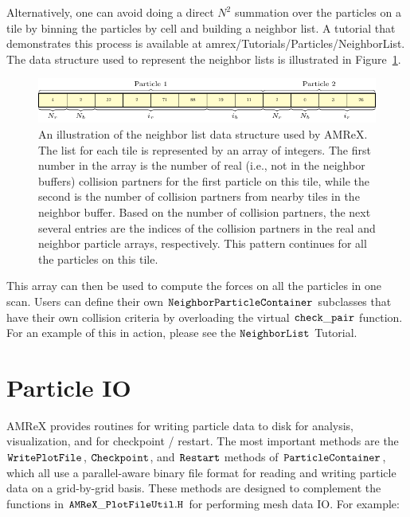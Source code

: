 Alternatively, one can avoid doing a direct $N^2$ summation over the particles on a tile by binning the particles by cell and building a neighbor list. A tutorial that demonstrates this process is available at amrex/Tutorials/Particles/NeighborList. The data structure used to represent the neighbor lists is illustrated in Figure~\ref{fig:particles:neighbor_list}.

\begin{figure}
  \centering
  \includegraphics[width=\textwidth]{./Particle/neighbor_list.pdf}
  \caption{\label{fig:particles:neighbor_list} An illustration of the neighbor list data structure used by AMReX. The list for each tile is represented by an array of integers. The first number in the array is the number of real (i.e., not in the neighbor buffers) collision partners for the first particle on this tile, while the second is the number of collision partners from nearby tiles in the neighbor buffer. Based on the number of collision partners, the next several entries are the indices of the collision partners in the real and neighbor particle arrays, respectively. This pattern continues for all the particles on this tile.}
\end{figure}

This array can then be used to compute the forces on all the particles in one scan. Users can define their own $\tt{NeighborParticleContainer}$ subclasses that have their own collision criteria by overloading the virtual $\tt{check\_pair}$ function. For an example of this in action, please see the $\tt{NeighborList}$ Tutorial.

\section{Particle IO}
\label{sec:Particles:IO}

AMReX provides routines for writing particle data to disk for analysis, visualization, and for checkpoint / restart. The most important methods are the $\tt{WritePlotFile}$, $\tt{Checkpoint}$, and $\tt{Restart}$ methods of $\tt{ParticleContainer}$, which all use a parallel-aware binary file format for reading and writing particle data on a grid-by-grid basis. These methods are designed to complement the functions in $\tt{AMReX\_PlotFileUtil.H}$ for performing mesh data IO. For example:


